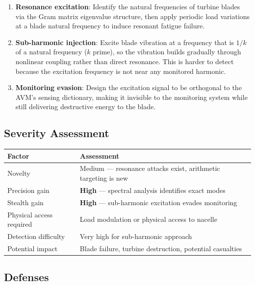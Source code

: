 \documentclass[11pt,a4paper]{article}
\begin{document}
\begin{enumerate}
  \item \textbf{Resonance excitation}: Identify the natural
    frequencies of turbine blades via the Gram matrix eigenvalue
    structure, then apply periodic load variations at a blade
    natural frequency to induce resonant fatigue failure.

  \item \textbf{Sub-harmonic injection}: Excite blade vibration at
    a frequency that is $1/k$ of a natural frequency ($k$ prime),
    so the vibration builds gradually through nonlinear coupling
    rather than direct resonance. This is harder to detect because
    the excitation frequency is not near any monitored harmonic.

  \item \textbf{Monitoring evasion}: Design the excitation signal
    to be orthogonal to the AVM's sensing dictionary, making it
    invisible to the monitoring system while still delivering
    destructive energy to the blade.
\end{enumerate}

\subsection{Severity Assessment}

\begin{center}
\begin{tabular}{@{}ll@{}}
\toprule
\textbf{Factor} & \textbf{Assessment} \\
\midrule
Novelty & Medium --- resonance attacks exist, arithmetic targeting is new \\
Precision gain & \textbf{High} --- spectral analysis identifies exact modes \\
Stealth gain & \textbf{High} --- sub-harmonic excitation evades monitoring \\
Physical access required & Load modulation or physical access to nacelle \\
Detection difficulty & Very high for sub-harmonic approach \\
Potential impact & Blade failure, turbine destruction, potential casualties \\
\bottomrule
\end{tabular}
\end{center}

\subsection{Defenses}
\end{document}
